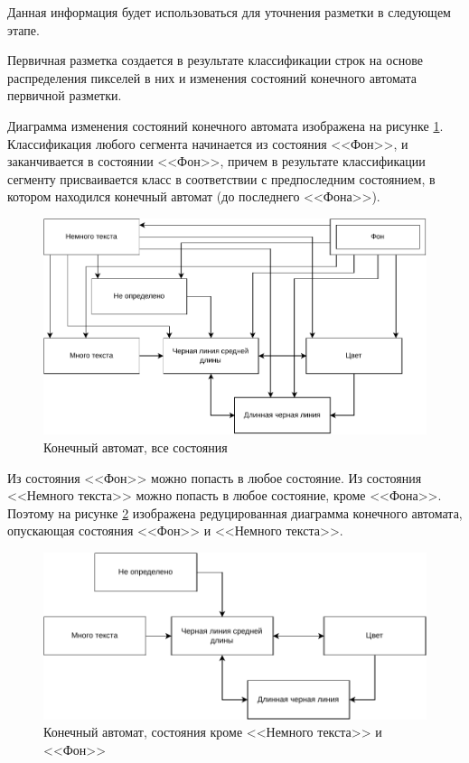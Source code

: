 Данная информация будет использоваться для уточнения разметки в следующем этапе.

Первичная разметка создается в результате классификации строк на основе распределения пикселей в них и изменения состояний конечного автомата первичной разметки.

Диаграмма изменения состояний конечного автомата изображена на рисунке \ref{fig:fsm-full}.
Классификация любого сегмента начинается из состояния <<Фон>>, и заканчивается в состоянии <<Фон>>, причем в результате классификации сегменту присваивается класс в соответствии с предпоследним состоянием, в котором находился конечный автомат (до последнего <<Фона>>).

\begin{figure}[H]
	\centering
	\includegraphics[width=\textwidth]{diag/fsm.full.pdf}
	\caption{Конечный автомат, все состояния}
	\label{fig:fsm-full}
\end{figure}

Из состояния <<Фон>> можно попасть в любое состояние.
Из состояния <<Немного текста>> можно попасть в любое состояние, кроме <<Фона>>.
Поэтому на рисунке \ref{fig:fsm-slim} изображена редуцированная диаграмма конечного автомата, опускающая состояния <<Фон>> и <<Немного текста>>.

\begin{figure}[H]
	\centering
	\includegraphics[width=\textwidth]{diag/fsm.slim.pdf}
	\caption{Конечный автомат, состояния кроме <<Немного текста>> и <<Фон>>}
	\label{fig:fsm-slim}
\end{figure}

